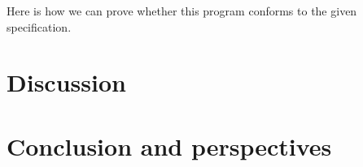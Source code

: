 \documentclass[adraft,creativecommons]{eptcs}
\begin{document}
Here is how we can prove whether this program conforms to the given specification.



\section{Discussion}

\section{Conclusion and perspectives}


\end{document}
